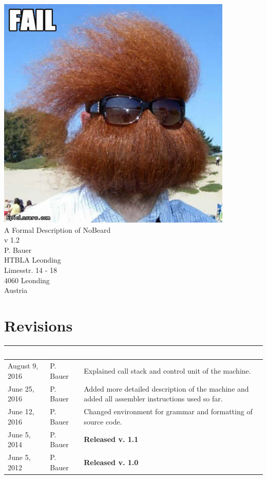 \documentclass[11pt]{report}
\newcommand{\leongage}{NoBeard}
\begin{document}
\begin{titlepage}
\begin{center}
\includegraphics[scale=0.3]{no_beard_1.jpg} \\[2em]
{\Huge A Formal Description of \leongage} \\[1em]
{\large v 1.2} \\[2em]
{\Large P. Bauer} \\[1em]
HTBLA Leonding \\
Limesstr. 14 - 18 \\
4060 Leonding \\
Austria
\end{center}
\end{titlepage}

\section*{Revisions}
\begin{tabular}{|l|l|p{}|}
\hline
\cellcolor{Gray}\textcolor{White}{Date} & \cellcolor{Gray}\textcolor{White}{Author} & \cellcolor{Gray}\textcolor{White}{Change} \\ \hline
August 9, 2016 & P. Bauer & Explained call stack and control unit of the machine.  \\ \hline
June 25, 2016 & P. Bauer & Added more detailed description of the machine and added all assembler instructions used so far.  \\ \hline
June 12, 2016 & P. Bauer & Changed environment for grammar and formatting of source code. \\ \hline
June 5, 2014 & P. Bauer & {\bf Released v. 1.1}  \\ \hline
June 5, 2012 & P. Bauer & {\bf Released v. 1.0}  \\ \hline
\end{tabular}
\end{document}
